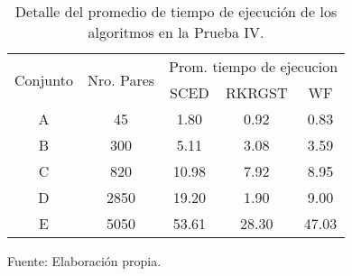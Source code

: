 \begin{table}[H]
\centering
\begin{tabular}{|c|c|ccc|}
\hline
\multirow{2}{*}{Conjunto} & \multirow{2}{*}{Nro. Pares} & \multicolumn{3}{c|}{Prom. tiempo de ejecucion}   \\ \cline{3-5}
                          &                             & \multicolumn{1}{c|}{SCED}  & \multicolumn{1}{c|}{RKRGST}   & WF \\ \hline
A                         & 45                          & \multicolumn{1}{c|}{1.80}  & \multicolumn{1}{c|}{0.92}  & 0.83    \\ \hline
B                         & 300                         & \multicolumn{1}{c|}{5.11}  & \multicolumn{1}{c|}{3.08}  & 3.59    \\ \hline
C                         & 820                         & \multicolumn{1}{c|}{10.98}  & \multicolumn{1}{c|}{7.92}  & 8.95    \\ \hline
D                         & 2850                        & \multicolumn{1}{c|}{19.20} & \multicolumn{1}{c|}{1.90}  & 9.00    \\ \hline
E                         & 5050                        & \multicolumn{1}{c|}{53.61} & \multicolumn{1}{c|}{28.30} & 47.03   \\ \hline
\end{tabular}
\caption{Detalle del promedio de tiempo de ejecución de los algoritmos en la Prueba IV.}
Fuente: Elaboración propia.
\label{pruebaTiempoIV}
\end{table}
